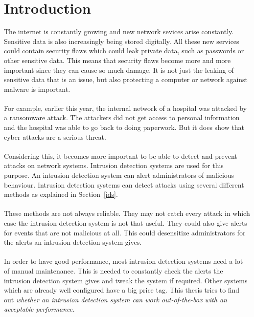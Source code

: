 
\chapter{Introduction} %

\label{Chapter1} %

The internet is constantly growing and new network sevices arise constantly. Sensitive data is also increasingly being stored digitally. All these new services could contain security flaws which could leak private data, such as passwords or other sensitive data. This means that security flaws become more and more important since they can cause so much damage. It is not just the leaking of sensitive data that is an issue, but also protecting a computer or network against malware is important. \\
\\
For example, earlier this year, the internal network of a hospital was attacked by a ransomware attack. The attackers did not get access to personal information and the hospital was able to go back to doing paperwork. But it does show that cyber attacks are a serious threat. \cite{ransomware}\\
\\
Considering this, it becomes more important to be able to detect and prevent attacks on network systems. Intrusion detection systems are used for this purpose. An intrusion detection system can alert administrators of malicious behaviour. Intrusion detection systems can detect attacks using several different methods as explained in Section~\ref{ids}. \\
\\
These methods are not always reliable. They may not catch every attack in which case the intrusion detection system is not that useful. They could also give alerts for events that are not malicious at all. This could desensitize administrators for the alerts an intrusion detection system gives. \\
\\
In order to have good performance, most intrusion detection systems need a lot of manual maintenance. This is needed to constantly check the alerts the intrusion detection system gives and tweak the system if required. Other systems which are already well configured have a big price tag. This thesis tries to find out \textit{whether an intrusion detection system can work out-of-the-box with an acceptable performance.} \\

